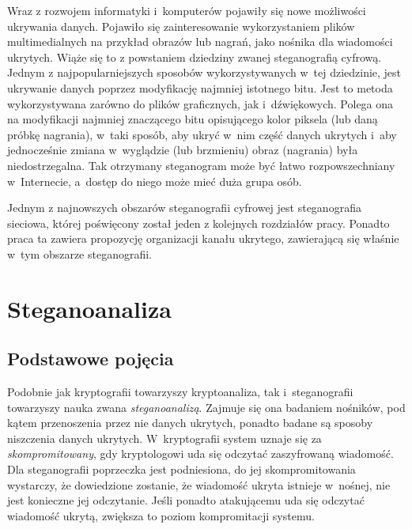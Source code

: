 \documentclass[a4paper, twoside, 12pt]{report}
\begin{document}
        Wraz z rozwojem informatyki i~komputerów pojawiły się nowe możliwości
        ukrywania danych. Pojawiło się zainteresowanie wykorzystaniem plików
        multimedialnych na przykład obrazów lub nagrań, jako nośnika dla wiadomości
        ukrytych. Wiąże się to z powstaniem dziedziny zwanej steganografią cyfrową.
        Jednym z najpopularniejszych sposobów wykorzystywanych w~tej dziedzinie,
        jest ukrywanie danych poprzez modyfikację najmniej istotnego bitu. Jest
        to metoda wykorzystywana zarówno do plików graficznych\cite{LSBSTEGANGRAPHY},
        jak i~dźwiękowych\cite{AUDIOLSBSTEGANGRAPHY}.
        Polega ona na modyfikacji najmniej znaczącego bitu opisującego kolor piksela
        (lub daną próbkę nagrania), w~taki sposób, aby ukryć w~nim część danych
        ukrytych i~aby jednocześnie zmiana w~wyglądzie (lub brzmieniu) obraz (nagrania)
        była niedostrzegalna. Tak otrzymany steganogram może być łatwo rozpowszechniany
        w~Internecie, a~dostęp do niego może mieć duża grupa osób.

        Jednym z najnowszych obszarów steganografii cyfrowej jest steganografia
        sieciowa, której poświęcony został jeden z kolejnych rozdziałów pracy.
        Ponadto praca ta zawiera propozycję organizacji kanału ukrytego, zawierającą
        się właśnie w~tym obszarze steganografii.

    \section{Steganoanaliza}
        \subsection{Podstawowe pojęcia}
        Podobnie jak kryptografii towarzyszy kryptoanaliza, tak i~steganografii
        towarzyszy nauka zwana \emph{steganoanalizą}. Zajmuje się ona badaniem
        nośników, pod kątem przenoszenia przez nie danych ukrytych, ponadto badane
        są sposoby niszczenia danych ukrytych. W~kryptografii system uznaje się
        za \emph{skompromitowany}, gdy kryptologowi uda się odczytać zaszyfrowaną wiadomość.
        Dla steganografii poprzeczka jest podniesiona, do jej skompromitowania wystarczy,
        że dowiedzione zostanie, że wiadomość ukryta istnieje w~nośnej, nie jest
        konieczne jej odczytanie. Jeśli ponadto atakującemu uda się odczytać wiadomość
        ukrytą, zwiększa to poziom kompromitacji systemu.
\end{document}
